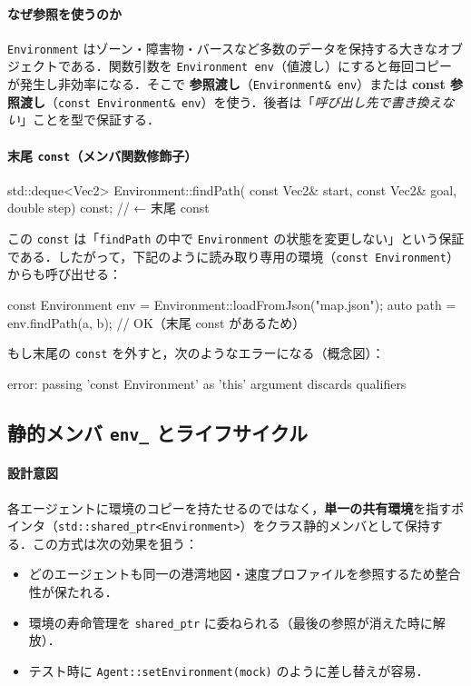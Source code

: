 \documentclass[10pt,letterpaper]{jsarticle}
\begin{document}
\paragraph{なぜ参照を使うのか}
\texttt{Environment} はゾーン・障害物・バースなど多数のデータを保持する大きなオブジェクトである．関数引数を \texttt{Environment env}（値渡し）にすると毎回コピーが発生し非効率になる．そこで \textbf{参照渡し}（\texttt{Environment\& env}）または \textbf{const 参照渡し}（\texttt{const Environment\& env}）を使う．後者は「\emph{呼び出し先で書き換えない}」ことを型で保証する．

\paragraph{末尾 \texttt{const}（メンバ関数修飾子）}
\begin{cppcode}
std::deque<Vec2> Environment::findPath(
    const Vec2& start, const Vec2& goal, double step) const; // ← 末尾 const
\end{cppcode}
この \texttt{const} は「\texttt{findPath} の中で \texttt{Environment} の状態を変更しない」という保証である．したがって，下記のように読み取り専用の環境（\texttt{const Environment}）からも呼び出せる：
\begin{cppcode}
const Environment env = Environment::loadFromJson("map.json");
auto path = env.findPath(a, b); // OK（末尾 const があるため）
\end{cppcode}
もし末尾の \texttt{const} を外すと，次のようなエラーになる（概念図）：
\begin{cppcode}
error: passing 'const Environment' as 'this' argument discards qualifiers
\end{cppcode}

\subsection{静的メンバ \texttt{env\_} とライフサイクル}
\paragraph{設計意図}
各エージェントに環境のコピーを持たせるのではなく，\textbf{単一の共有環境}を指すポインタ（\texttt{std::shared\_ptr<Environment>}）をクラス静的メンバとして保持する．この方式は次の効果を狙う：
\begin{itemize}
\item どのエージェントも同一の港湾地図・速度プロファイルを参照するため整合性が保たれる．
\item 環境の寿命管理を \texttt{shared\_ptr} に委ねられる（最後の参照が消えた時に解放）．
\item テスト時に \texttt{Agent::setEnvironment(mock)} のように差し替えが容易．
\end{itemize}
\end{document}
